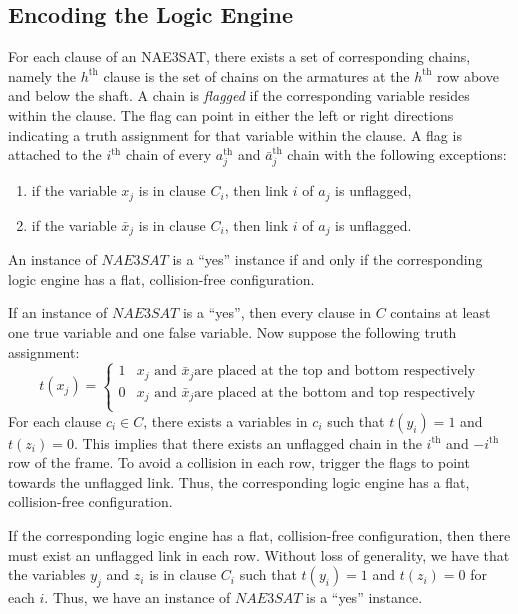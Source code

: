 \subsection{Encoding the Logic Engine}
For each clause of an NAE3SAT, there exists a set of corresponding chains, namely the $h^\text{th}$ 
clause is the set of chains on the armatures at the $h^\text{th}$ row above and below the shaft. A 
chain is \textit{flagged} if the corresponding variable resides within the clause.  The flag can 
point in either the left or right directions indicating a truth assignment for that variable within 
the clause.  A flag is attached to the $i^\text{th}$ chain of every $a_j^\text{th}$ and 
$\bar{a}_j^\text{th}$ chain with the following exceptions:
\begin{enumerate}
 \item if the variable $x_j$  is in clause $C_i$, then link $i$ of $a_j$ is unflagged,
 \item if the variable $\bar{x}_j$ is in clause $C_i$, then link $i$ of $a_j$ is unflagged.
\end{enumerate}
\begin{thm}\label{thm:Satisfiability-1}
 An instance of $NAE3SAT$ is a ``yes'' instance if and only if the corresponding logic engine has a 
flat, collision-free configuration.
\end{thm}
\begin{pf}
 If an instance of $NAE3SAT$ is a ``yes'', then every clause in $C$ contains at least one true 
variable and one false variable.  Now suppose the following truth assignment:
\begin{equation}\label{eqn:Satisfiability-1}
 t\left( x_j \right) = \left\lbrace\begin{array}{cr}
  1 & x_j\text{ and }\bar{x}_j \text{are placed at the top and bottom respectively}\\
  0 & x_j\text{ and }\bar{x}_j \text{are placed at the bottom and top respectively}\\
 \end{array}\right.
\end{equation}
For each clause $c_i \in C$, there exists a variables in $c_i$ such that $t\left( y_i \right) = 1$ 
and $t\left( z_i \right) = 0$.  This implies that there exists an unflagged chain in the 
$i^\text{th}$ and $-i^\text{th}$ row of the frame.  To avoid a collision in each row, trigger the 
flags to point towards the unflagged link. Thus, the corresponding logic engine has a 
flat, collision-free configuration.

If the corresponding logic engine has a flat, collision-free configuration, then there must exist 
an unflagged link in each row.  Without loss of generality, we have that the variables $y_j$ and 
$z_i$ is in clause $C_i$ such that $t\left( y_i \right) = 1$ and $t\left( z_i \right) = 0$ for each 
$i$.  Thus, we have an instance of $NAE3SAT$ is a ``yes'' instance. \cite{BET+99}
\end{pf}

